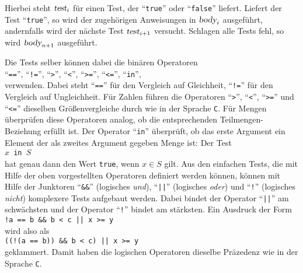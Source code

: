 Hierbei steht $\textsl{test}_i$ für einen Test, der ``\texttt{true}'' oder
``\texttt{false}'' liefert.  Liefert der Test ``\texttt{true}'', so wird der zugehörigen
Anweisungen in $\textsl{body}_i$ ausgeführt, andernfalls wird der nächste
Test  $\textsl{test}_{i+1}$ versucht.  Schlagen alle Tests fehl, so wird
$\textsl{body}_{n+1}$ ausgeführt.
 
Die Tests selber können dabei die binären Operatoren 
\\[0.2cm]
\hspace*{1.3cm}
``\texttt{==}'',
``\texttt{!=}'',
``\texttt{>}'',
``\texttt{<}'',
``\texttt{>=}'',
``\texttt{<=}'',
``\texttt{in}'',
\\[0.2cm]
verwenden. Dabei  steht ``\texttt{==}'' für den Vergleich auf Gleichheit,
``\texttt{!=}'' für den Vergleich auf Ungleichheit.
Für Zahlen führen die Operatoren ``\texttt{>}'',
``\texttt{<}'',
``\texttt{>=}'' und 
``\texttt{<=}''
dieselben Größenvergleiche durch wie in der Sprache \texttt{C}.  Für Mengen
überprüfen diese Operatoren analog, ob die entsprechenden Teilmengen-Beziehung
erfüllt ist.  Der Operator ``\texttt{in}'' überprüft, ob das erste Argument ein
Element der als zweites Argument gegeben Menge ist: Der Test \\[0.2cm]
\hspace*{1.3cm} \texttt{$x$ in $S$} \\[0.2cm]
hat genau dann den Wert \texttt{true}, wenn $x \in S$ gilt.
Aus den einfachen Tests, die mit Hilfe der oben vorgestellten Operatoren
definiert werden können, können mit Hilfe der Junktoren ``\texttt{\&\&}'' (logisches \emph{und}),
``\texttt{||}'' (logisches \emph{oder}) und ``\texttt{!}'' (logisches \emph{nicht})
komplexere Tests aufgebaut werden.  
Dabei bindet der Operator ``\texttt{||}'' am schwächsten und der Operator ``\texttt{!}''
bindet am stärksten.  Ein Ausdruck der Form
\\[0.2cm]
\hspace*{1.3cm}
\texttt{!a == b \&\& b < c || x >= y}
\\[0.2cm]
wird also als
\\[0.2cm]
\hspace*{1.3cm}
\texttt{((!(a == b)) \&\& b < c) || x >= y}
\\[0.2cm]
geklammert.  Damit haben die logischen Operatoren dieselbe Präzedenz wie in der Sprache \texttt{C}.

